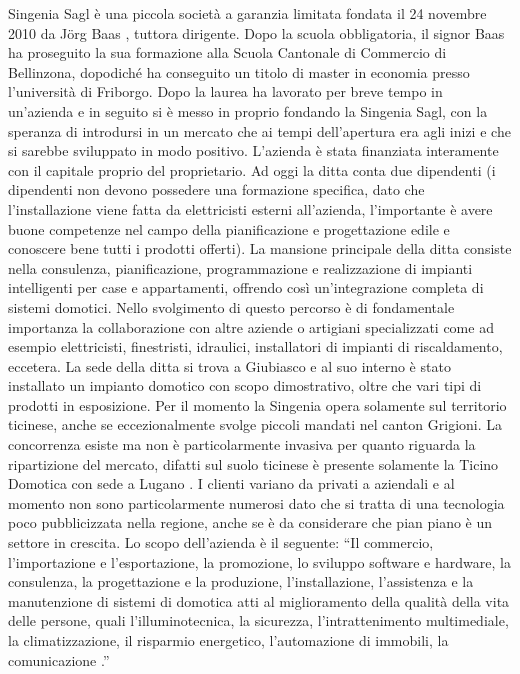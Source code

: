 Singenia Sagl è una piccola società a garanzia limitata fondata il 24 novembre 2010 da Jörg Baas , tuttora dirigente. Dopo la scuola obbligatoria, il signor Baas ha proseguito la sua formazione alla Scuola Cantonale di Commercio di Bellinzona, dopodiché ha conseguito un titolo di master in economia presso l’università di Friborgo. Dopo la laurea ha lavorato per breve tempo in un’azienda e in seguito si è messo in proprio fondando la Singenia Sagl, con la speranza di introdursi in un mercato che ai tempi dell’apertura era agli inizi e che si sarebbe sviluppato in modo positivo. L’azienda è stata finanziata interamente con il capitale proprio del proprietario. Ad oggi la ditta conta due dipendenti (i dipendenti non devono possedere una formazione specifica, dato che l’installazione viene fatta da elettricisti esterni all’azienda, l’importante è avere buone competenze nel campo della pianificazione e progettazione edile e conoscere bene tutti i prodotti offerti).
La mansione principale della ditta consiste nella consulenza, pianificazione, programmazione e realizzazione di impianti intelligenti per case e appartamenti, offrendo così un’integrazione completa di sistemi domotici. Nello svolgimento di questo percorso è di fondamentale importanza la collaborazione con altre aziende o artigiani specializzati come ad esempio elettricisti, finestristi, idraulici, installatori di impianti di riscaldamento, eccetera. La sede della ditta si trova a Giubiasco e al suo interno è stato installato un impianto domotico con scopo dimostrativo, oltre che vari tipi di prodotti in esposizione. Per il momento la Singenia opera solamente sul territorio ticinese, anche se eccezionalmente svolge piccoli mandati nel canton Grigioni. La concorrenza esiste ma non è particolarmente invasiva per quanto riguarda la ripartizione del mercato, difatti sul suolo ticinese è presente solamente la Ticino Domotica con sede a Lugano . I clienti variano da privati a aziendali e al momento non sono particolarmente numerosi dato che si tratta di una tecnologia poco pubblicizzata nella regione, anche se è da considerare che pian piano è un settore in crescita.
Lo scopo dell’azienda è il seguente: 
“Il commercio, l'importazione e l'esportazione, la promozione, lo sviluppo software e hardware, la consulenza, la progettazione e la produzione, l'installazione, l'assistenza e la manutenzione di sistemi di domotica atti al miglioramento della qualità della vita delle persone, quali l'illuminotecnica, la sicurezza, l'intrattenimento multimediale, la climatizzazione, il risparmio energetico, l'automazione di immobili, la comunicazione .”
